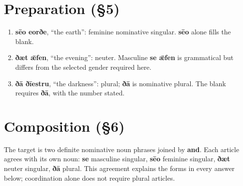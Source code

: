 





\section*{Preparation (§5)}


\begin{enumerate}
\item[1.] \textbf{sēo eorðe}, “the earth”: feminine nominative singular. \textbf{sēo} alone fills the blank.
\item[2.] \textbf{ðæt ǣfen}, “the evening”: neuter. Masculine \textbf{se ǣfen} is grammatical but differs from the selected gender required here.
\item[3.] \textbf{ðā ðīestru}, “the darkness”: plural; \textbf{ðā} is nominative plural. The blank requires \textbf{ðā}, with the number stated.
\end{enumerate}


\section*{Composition (§6)}


The target is two definite nominative noun phrases joined by \textbf{and}. Each article agrees with its own noun: \textbf{se} masculine singular, \textbf{sēo} feminine singular, \textbf{ðæt} neuter singular, \textbf{ðā} plural. This agreement explains the forms in every answer below; coordination alone does not require plural articles.


